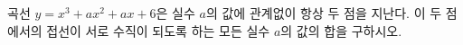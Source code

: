 곡선 $y=x^3+ax^2+ax+6$은 실수 $a$의 값에 관계없이 항상 두 점을 지난다. 이 두 점에서의 접선이 서로 수직이 되도록 하는 모든 실수 $a$의 값의 합을 구하시오.
